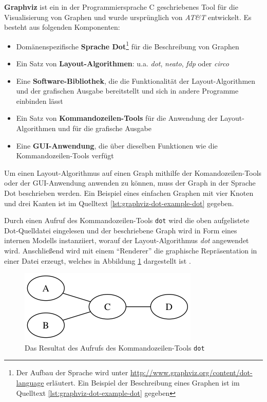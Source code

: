 \textbf{Graphviz} ist ein in der Programmiersprache C geschriebenes Tool für die Visualisierung von Graphen und wurde ursprünglich von \textit{AT\&T} entwickelt. Es besteht aus folgenden Komponenten:

\begin{itemize}
    \item Domänenspezifische \textbf{Sprache Dot}\footnote{Der Aufbau der Sprache wird unter \url{http://www.graphviz.org/content/dot-language} erläutert. Ein Beispiel der Beschreibung eines Graphen ist im Quelltext \ref{lst:graphviz-dot-example-dot} gegeben} für die Beschreibung von Graphen
    \item Ein Satz von \textbf{Layout-Algorithmen}: u.a. \textit{dot}, \textit{neato}, \textit{fdp} oder \textit{circo} \cite{Gansner14Using, NorthGansner14Dot-Manual}
    \item Eine \textbf{Software-Bibliothek}, die die Funktionalität der Layout-Algorithmen und der grafischen Ausgabe bereitstellt und sich in andere Programme einbinden lässt \cite{Gansner14Using}
    \item Ein Satz von \textbf{Kommandozeilen-Tools} für die Anwendung der Layout-Algorithmen und für die grafische Ausgabe \cite{NorthGansner14Dot-Manual}
    \item Eine \textbf{GUI-Anwendung}, die über dieselben Funktionen wie die Kommandozeilen-Tools verfügt
\end{itemize}

Um einen Layout-Algorithmus auf einen Graph mithilfe der Komandozeilen-Tools oder der GUI-Anwendung anwenden zu können, muss der Graph in der Sprache Dot beschrieben werden. Ein Beispiel eines einfachen Graphen mit vier Knoten und drei Kanten ist im Quelltext \ref{lst:graphviz-dot-example-dot} gegeben.



Durch einen Aufruf des Kommandozeilen-Tools \texttt{dot} wird die oben aufgelistete Dot-Quelldatei eingelesen und der beschriebene Graph wird in Form eines internen Modells instanziiert, worauf der Layout-Algorithmus \textit{dot} angewendet wird. Anschließend wird mit einem \enquote{Renderer} die graphische Repräsentation in einer Datei erzeugt, welches in Abbildung \ref{fig:graphviz-dot-example} dargestellt ist \cite{Gansner14Using}.

\begin{figure}[hbt]
    \centering
    \includegraphics[scale=0.75]{assets/graphviz-dot-example.png}
    \caption{Das Resultat des Aufrufs des Kommandozeilen-Tools \texttt{dot}}
    \label{fig:graphviz-dot-example}
\end{figure}

